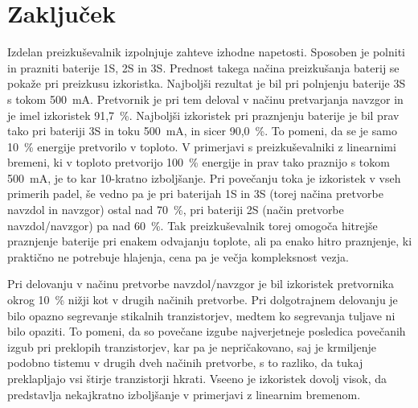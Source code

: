 \documentclass[a4paper,twoside,openright,12pt,slovene]{book}
\begin{document}
\chapter{Zaključek} \label{ch:zakljucek}
Izdelan preizkuševalnik izpolnjuje zahteve izhodne napetosti.
Sposoben je polniti in prazniti baterije 1S, 2S in 3S.\@
Prednost takega načina preizkušanja baterij se pokaže pri preizkusu izkoristka.
Najboljši rezultat je bil pri polnjenju baterije 3S s tokom 500~mA.\@
Pretvornik je pri tem deloval v načinu pretvarjanja navzgor in je imel izkoristek 91,7~\%.
Najboljši izkoristek pri praznjenju baterije je bil prav tako pri bateriji 3S in toku 500~mA, in sicer 90,0~\%.
To pomeni, da se je samo 10~\% energije pretvorilo v toploto.
V primerjavi s preizkuševalniki z linearnimi bremeni, ki v toploto pretvorijo 100~\% energije in prav tako praznijo s tokom 500~mA, je to kar 10-kratno izboljšanje.
Pri povečanju toka je izkoristek v vseh primerih padel, še vedno pa je pri baterijah 1S in 3S (torej načina pretvorbe navzdol in navzgor) ostal nad 70~\%,
pri bateriji 2S (način pretvorbe navzdol/navzgor) pa nad 60~\%.
Tak preizkuševalnik torej omogoča hitrejše praznjenje baterije pri enakem odvajanju toplote,
ali pa enako hitro praznjenje, ki praktično ne potrebuje hlajenja, cena pa je večja kompleksnost vezja.

Pri delovanju v načinu pretvorbe navzdol/navzgor je bil izkoristek pretvornika okrog 10~\% nižji kot v drugih načinih pretvorbe.
Pri dolgotrajnem delovanju je bilo opazno segrevanje stikalnih tranzistorjev, medtem ko segrevanja tuljave ni bilo opaziti.
To pomeni, da so povečane izgube najverjetneje posledica povečanih izgub pri preklopih tranzistorjev, kar pa je nepričakovano,
saj je krmiljenje podobno tistemu v drugih dveh načinih pretvorbe, s to razliko, da tukaj preklapljajo vsi štirje tranzistorji hkrati.
Vseeno je izkoristek dovolj visok, da predstavlja nekajkratno izboljšanje v primerjavi z linearnim bremenom.
\end{document}
